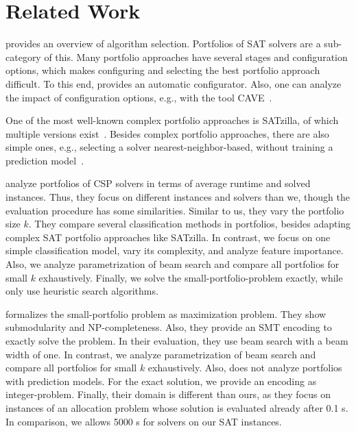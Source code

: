 \documentclass[conference]{IEEEtran}
\begin{document}
\section{Related Work}
\label{sec:related-work}


\cite{kerschke2019automated} provides an overview of algorithm selection.
Portfolios of SAT solvers are a sub-category of this.
Many portfolio approaches have several stages and configuration options, which makes configuring and selecting the best portfolio approach difficult.
To this end, \cite{lindauer2015autofolio} provides an automatic configurator.
Also, one can analyze the impact of configuration options, e.g., with the tool CAVE~\cite{biedenkapp2018cave}.

One of the most well-known complex portfolio approaches is SATzilla, of which multiple versions exist~\cite{xu2008satzilla, xu2012satzilla2012}.
Besides complex portfolio approaches, there are also simple ones, e.g., selecting a solver nearest-neighbor-based, without training a prediction model~\cite{malitsky2011non, nikolic2013simple, samulowitz2013snappy}.

\cite{amadini2014empirical, amadini2016extensive} analyze portfolios of CSP solvers in terms of average runtime and solved instances.
Thus, they focus on different instances and solvers than we, though the evaluation procedure has some similarities.
Similar to us, they vary the portfolio size $k$.
They compare several classification methods in portfolios, besides adapting complex SAT portfolio approaches like SATzilla.
In contrast, we focus on one simple classification model, vary its complexity, and analyze feature importance.
Also, we analyze parametrization of beam search and compare all portfolios for small $k$ exhaustively.
Finally, we solve the small-portfolio-problem exactly, while \cite{amadini2014empirical} only use heuristic search algorithms.

\cite{nof2020real} formalizes the small-portfolio problem as maximization problem.
They show submodularity and NP-completeness.
Also, they provide an SMT encoding to exactly solve the problem.
In their evaluation, they use beam search with a beam width of one.
In contrast, we analyze parametrization of beam search and compare all portfolios for small $k$ exhaustively.
Also, \cite{nof2020real} does not analyze portfolios with prediction models.
For the exact solution, we provide an encoding as integer-problem.
Finally, their domain is different than ours, as they focus on instances of an allocation problem whose solution is evaluated already after 0.1 s.
In comparison, we allows 5000 s for solvers on our SAT instances.
\end{document}
